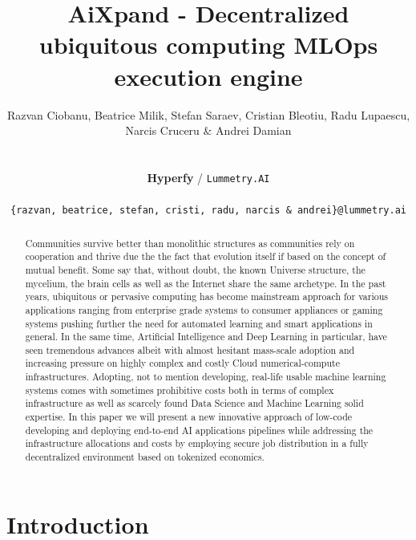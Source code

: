 \documentclass{article}
\title{
AiXpand - Decentralized ubiquitous computing MLOps execution engine
}
\author{
  Razvan Ciobanu, Beatrice Milik, Stefan Saraev, Cristian Bleotiu, \AND Radu Lupaescu, Narcis Cruceru \& Andrei Damian \\\\\\
  \textbf{Hyperfy} / \texttt{Lummetry.AI} \\\\
  \texttt{\{razvan, beatrice, stefan, cristi, radu, narcis \& andrei\}@lummetry.ai} \\
}
\begin{document}
\maketitle


\begin{abstract}
Communities survive better than monolithic structures as communities rely on cooperation and thrive due the the fact that evolution itself if based on the concept of mutual benefit. Some say that, without doubt, the known Universe structure, the mycelium, the brain cells as well as the Internet share the same archetype.
In the past years, ubiquitous or pervasive computing has become mainstream approach for various applications ranging from enterprise grade systems to consumer appliances or gaming systems pushing further the need for automated learning and smart applications in general. In the same time, Artificial Intelligence and Deep Learning in particular, have seen tremendous advances albeit with almost hesitant mass-scale adoption and increasing pressure on highly complex and costly Cloud numerical-compute infrastructures. Adopting, not to mention developing, real-life usable machine learning systems comes with sometimes prohibitive costs both in terms of complex infrastructure as well as scarcely found Data Science and Machine Learning solid expertise. In this paper we will present a new innovative approach of low-code developing and deploying end-to-end AI applications pipelines while addressing the infrastructure allocations and costs by employing secure job distribution in a fully decentralized environment based on tokenized economics. 
\end{abstract}



\section{Introduction}
\end{document}
